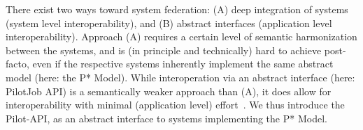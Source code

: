 \documentclass[conference,final]{IEEEtran}
\newcommand{\jhanote}[1]{ {\textcolor{red} { ***shantenu: #1 }}}
\newcommand{\jhanote}[1]{}
\begin{document}
%
%
% 
% 

There exist two ways toward system federation: (A) deep integration of
systems (system level interoperability), and (B) abstract interfaces
(application level interoperability).  Approach (A) requires a certain
level of semantic harmonization between the systems, and is (in
principle and technically) hard to achieve post-facto, even if the
respective systems inherently implement the same abstract model (here:
the P* Model).  While interoperation via an abstract interface (here:
PilotJob API) is a semantically weaker approach than (A), it does
allow for interoperability with minimal (application level)
effort~\cite{saga_bigjob_condor_cloud,saga_gin}.  We thus introduce
the Pilot-API, as an abstract interface to systems implementing the P*
Model.



\end{document}
